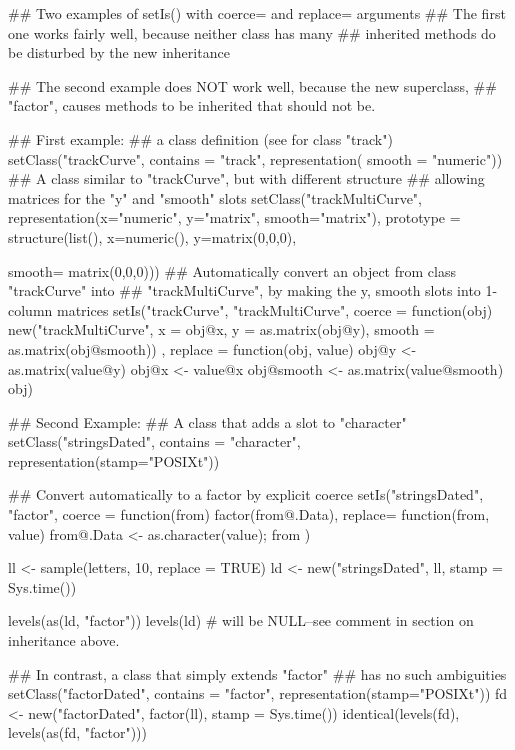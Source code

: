 \begin{Examples}
\begin{ExampleCode}

## Two examples of setIs() with coerce= and replace= arguments
## The first one works fairly well, because neither class has many
## inherited methods do be disturbed by the new inheritance

## The second example does NOT work well, because the new superclass,
## "factor", causes methods to be inherited that should not be.

## First example:
## a class definition (see  for class "track")
setClass("trackCurve", contains = "track",
         representation( smooth = "numeric"))
## A class similar to "trackCurve", but with different structure
## allowing matrices for the "y" and "smooth" slots
setClass("trackMultiCurve",
         representation(x="numeric", y="matrix", smooth="matrix"),
         prototype = structure(list(), x=numeric(), y=matrix(0,0,0),

                               smooth= matrix(0,0,0)))
## Automatically convert an object from class "trackCurve" into
## "trackMultiCurve", by making the y, smooth slots into 1-column matrices
setIs("trackCurve",
      "trackMultiCurve",
      coerce = function(obj) {
        new("trackMultiCurve",
            x = obj@x,
            y = as.matrix(obj@y),
            smooth = as.matrix(obj@smooth))
      },
      replace = function(obj, value) {
        obj@y <- as.matrix(value@y)
        obj@x <- value@x
        obj@smooth <- as.matrix(value@smooth)
        obj})




## Second Example:
## A class that adds a slot to "character"
setClass("stringsDated", contains = "character",
         representation(stamp="POSIXt"))

## Convert automatically to a factor by explicit coerce
setIs("stringsDated", "factor",
      coerce = function(from) factor(from@.Data),
      replace= function(from, value) {
                  from@.Data <- as.character(value); from })

ll <- sample(letters, 10, replace = TRUE)
ld <- new("stringsDated", ll, stamp = Sys.time())

levels(as(ld, "factor"))
levels(ld) # will be NULL--see comment in section on inheritance above.

## In contrast, a class that simply extends "factor"
## has no such ambiguities
setClass("factorDated", contains = "factor",
         representation(stamp="POSIXt"))
fd <- new("factorDated", factor(ll), stamp = Sys.time())
identical(levels(fd), levels(as(fd, "factor")))
\end{ExampleCode}
\end{Examples}

